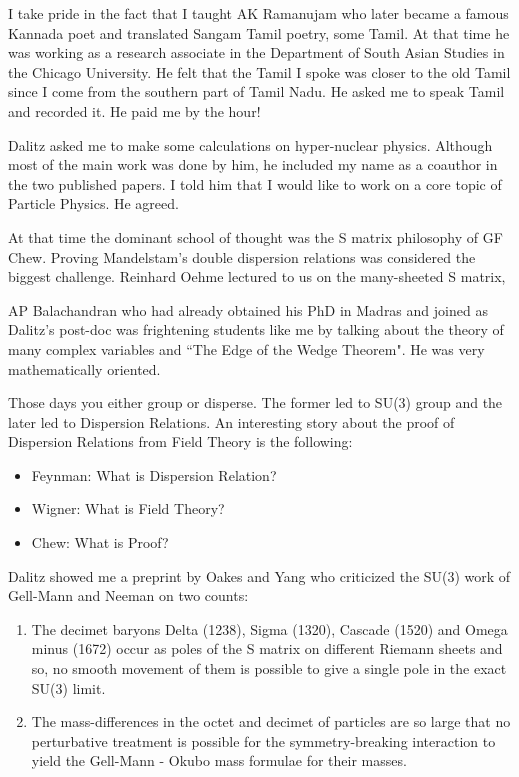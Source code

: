   
I take pride in the fact that I taught AK Ramanujam who later became
a famous Kannada poet and translated Sangam Tamil poetry, some Tamil.
At that time he was working as a research associate in the Department
of South Asian Studies in the Chicago University. He felt that the
Tamil I spoke was closer to the old Tamil since I come from the
southern part of Tamil Nadu. He asked me to speak Tamil and recorded it.
He paid me by the hour!


Dalitz asked me to make some calculations on hyper-nuclear physics. 
Although most of the main work was done by him, he included my name as a 
coauthor in the two published papers. I told him that I would like to 
work on a core topic of Particle Physics. He agreed.


At that time the dominant school of thought was the S matrix philosophy 
of GF Chew. Proving Mandelstam's double dispersion relations was 
considered the biggest challenge. Reinhard Oehme lectured to us on the 
many-sheeted S matrix, 


AP Balachandran who had already obtained his PhD in Madras and joined as 
Dalitz's post-doc was frightening students like me by talking about the 
theory of many complex variables and ``The Edge of the Wedge Theorem". He 
was very mathematically orien\-ted.


Those days you either group or disperse. The former led to SU(3) group 
and the later led to Dispersion Relations. An intere\-sting story about 
the proof of Dispersion Relations from Field Theory is the following:

\vspace{-\topsep}
\begin{itemize}
\itemsep=0pt
\item Feynman: What is Dispersion Relation? 
\item Wigner: What is Field Theory? 
\item Chew: What is Proof?
\end{itemize}
\vspace{-\topsep}

Dalitz showed me a preprint by Oakes and Yang who criticized the SU(3) 
work of Gell-Mann and Neeman on two counts:

\begin{enumerate}
\item The decimet baryons Delta (1238), Sigma (1320), Cascade (1520) and 
Omega minus (1672) occur as poles of the S matrix\- on different Riemann 
sheets and so, no smooth movement of them is possible to give a single 
pole in the exact SU(3) limit.

\item The mass-differences in the octet and decimet of particles are so 
large that no perturbative treatment is possible for the 
symmetry-breaking interaction to yield the Gell-Mann - Okubo mass 
formulae for their masses.
\end{enumerate}


